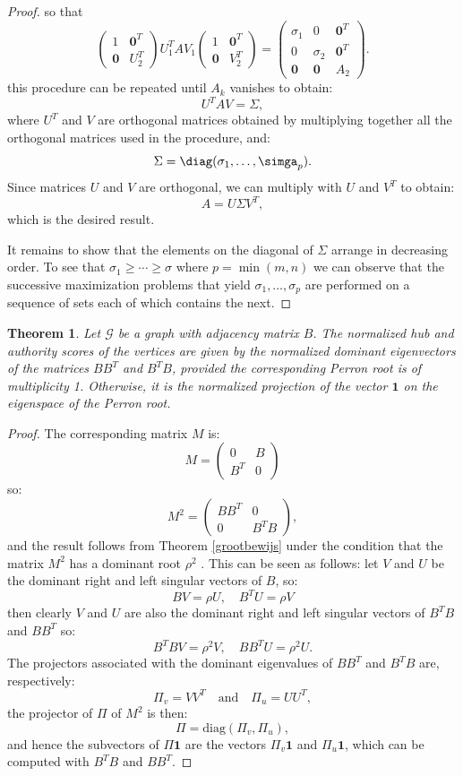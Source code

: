 \documentclass[a4paper,11pt]{report}
\newtheorem{theorem}{Theorem}[section]
\newcommand{\graf}{\mathscr{G}}
\begin{document}
\begin{proof}
  so that 
  $$\begin{pmatrix}1 & \mathbf{0}^T\\ \mathbf{0} & U_2^T\end{pmatrix} U_1^T A V_1  \begin{pmatrix}1 & \mathbf{0}^T\\ \mathbf{0} & V_2^T\end{pmatrix} 
  = \begin{pmatrix}\sigma_1 & 0 &\mathbf{0}^T\\
0 & \sigma_2 &  \mathbf{0}^T\\
\mathbf{0} & \mathbf{0} & A_2
\end{pmatrix}.$$
this procedure can be repeated until $A_k$ vanishes to obtain:
$$U^T A V = \Sigma,$$
where $U^T$ and $V$ are orthogonal matrices obtained by multiplying together all 
the orthogonal matrices used in the procedure, and:
$$\Sigma = \diag(\sigma_1, \ldots, \simga_p).$$
Since matrices $U$ and $V$ are orthogonal, we can multiply with $U$ and $V^T$ to 
obtain:
$$A = U \Sigma V^T,$$
which is the desired result.

It remains to show that the elements on the diagonal of $\Sigma$ arrange in decreasing order. To see that $\sigma_1 \geq \cdots \geq \sigma$ 
where $p = \min(m,n)$ we can observe that the successive maximization problems 
that yield $\sigma_1, \ldots, \sigma_p$ are performed on a sequence of sets each 
of which contains the next. 
 \end{proof}
 \begin{theorem}
  Let $\graf$ be a graph with adjacency matrix $B$. The normalized hub and 
  authority scores of the vertices are given by the normalized dominant 
  eigenvectors of the matrices $BB^T$ and $B^TB$, provided the corresponding 
  Perron root is of multiplicity 1. Otherwise, it is the normalized projection 
  of the vector $\mathbf{1}$ on the eigenspace of the Perron root.
\end{theorem}
\begin{proof}
  The corresponding matrix $M$ is:
  $$M =  \begin{pmatrix} 
0 & B\\
B^T & 0
\end{pmatrix}$$
so:
$$M^2 = \begin{pmatrix} 
BB^T & 0\\
0 & B^TB
\end{pmatrix},$$
and the result follows from Theorem \ref{grootbewijs} under the condition that 
the matrix $M^2$ has a dominant root $\rho^2$ . This can be seen as follows: let $V$ and $U$ be
the dominant right and left singular vectors of $B$, so:
$$BV = \rho U, \quad B^TU = \rho V$$
then clearly $V$ and $U$ are also the dominant right and left singular vectors of $B^TB$ 
and $BB^T$ so:
$$B^TBV = \rho^2V, \quad BB^TU= \rho^2U.$$
The projectors associated with the dominant eigenvalues of $BB^T$ and $B^TB$ 
are, respectively:
$$\Pi_v = VV^T \quad \text{and} \quad \Pi_u = UU^T,$$
the projector of $\Pi$ of $M^2$ is then:
$$\Pi = \text{diag}(\Pi_v, \Pi_u),$$
and hence the subvectors of $\Pi\mathbf{1}$ are the vectors $\Pi_{v}\mathbf{1}$ 
and $\Pi_u\mathbf{1}$, which can be computed with $B^TB$ and $BB^T$.
\end{proof}
\end{document}
